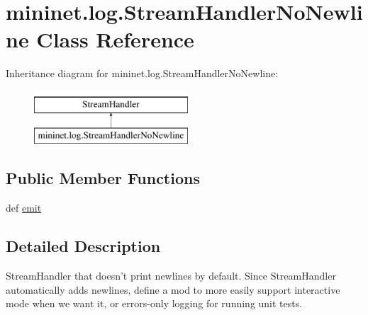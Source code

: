 \hypertarget{classmininet_1_1log_1_1StreamHandlerNoNewline}{\section{mininet.\-log.\-Stream\-Handler\-No\-Newline Class Reference}
\label{classmininet_1_1log_1_1StreamHandlerNoNewline}
}
Inheritance diagram for mininet.\-log.\-Stream\-Handler\-No\-Newline\-:\begin{figure}[H]
\begin{center}
\leavevmode
\includegraphics[height=2.000000cm]{classmininet_1_1log_1_1StreamHandlerNoNewline}
\end{center}
\end{figure}
\subsection*{Public Member Functions}
\begin{DoxyCompactItemize}
\item 
def \hyperlink{classmininet_1_1log_1_1StreamHandlerNoNewline_af7906c402ac800eae40d6f26e998894b}{emit}
\end{DoxyCompactItemize}


\subsection{Detailed Description}
\begin{DoxyVerb}StreamHandler that doesn't print newlines by default.
   Since StreamHandler automatically adds newlines, define a mod to more
   easily support interactive mode when we want it, or errors-only logging
   for running unit tests.\end{DoxyVerb}
 

